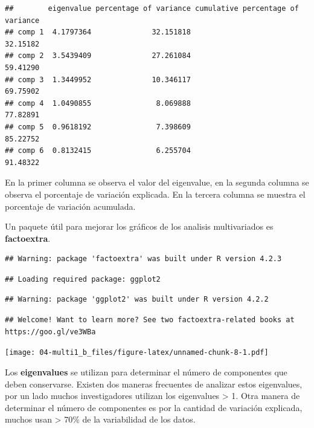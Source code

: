 \documentclass[
]{book}
\newenvironment{Shaded}{\begin{snugshade}}{\end{snugshade}}
\newcommand{\CommentTok}[1]{\textcolor[rgb]{0.56,0.35,0.01}{\textit{#1}}}
\newcommand{\DecValTok}[1]{\textcolor[rgb]{0.00,0.00,0.81}{#1}}
\newcommand{\FunctionTok}[1]{\textcolor[rgb]{0.00,0.00,0.00}{#1}}
\newcommand{\NormalTok}[1]{#1}
\newcommand{\OtherTok}[1]{\textcolor[rgb]{0.56,0.35,0.01}{#1}}
\newcommand{\SpecialCharTok}[1]{\textcolor[rgb]{0.00,0.00,0.00}{#1}}
\begin{document}
\begin{Shaded}
\end{Shaded}

\begin{verbatim}
##        eigenvalue percentage of variance cumulative percentage of variance
## comp 1  4.1797364              32.151818                          32.15182
## comp 2  3.5439409              27.261084                          59.41290
## comp 3  1.3449952              10.346117                          69.75902
## comp 4  1.0490855               8.069888                          77.82891
## comp 5  0.9618192               7.398609                          85.22752
## comp 6  0.8132415               6.255704                          91.48322
\end{verbatim}

En la primer columna se observa el valor del eigenvalue, en la segunda columna se observa el porcentaje de variación explicada. En la tercera columna se muestra el porcentaje de variación acumulada.

Un paquete útil para mejorar los gráficos de los analisis multivariados es \textbf{factoextra}.

\begin{verbatim}
## Warning: package 'factoextra' was built under R version 4.2.3
\end{verbatim}

\begin{verbatim}
## Loading required package: ggplot2
\end{verbatim}

\begin{verbatim}
## Warning: package 'ggplot2' was built under R version 4.2.2
\end{verbatim}

\begin{verbatim}
## Welcome! Want to learn more? See two factoextra-related books at https://goo.gl/ve3WBa
\end{verbatim}

\texttt{[image: 04-multi1\_b\_files/figure-latex/unnamed-chunk-8-1.pdf]}

Los \textbf{eigenvalues} se utilizan para determinar el número de componentes que deben conservarse. Existen dos maneras frecuentes de analizar estos eigenvalues, por un lado muchos investigadores utilizan los eigenvalues \textgreater{} 1. Otra manera de determinar el número de componentes es por la cantidad de variación explicada, muchos usan \textgreater{} 70\% de la variabilidad de los datos.
\end{document}
